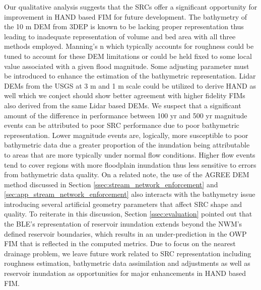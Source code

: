 Our qualitative analysis suggests that the SRCs offer a significant opportunity for improvement in HAND based FIM for future development.
The bathymetry of the 10 m DEM from 3DEP is known to be lacking proper representation thus leading to inadequate representation of volume and bed area with all three methods employed.
Manning's n which typically accounts for roughness could be tuned to account for these DEM limitations or could be held fixed to some local value associated with a given flood magnitude.
Some adjusting parameter must be introduced to enhance the estimation of the bathymetric representation.
Lidar DEMs from the USGS at 3 m and 1 m scale could be utilized to derive HAND as well which we conject should show better agreement with higher fidelity FIMs also derived from the same Lidar based DEMs.
We suspect that a significant amount of the difference in performance between 100 yr and 500 yr magnitude events can be attributed to poor SRC performance due to poor bathymetric representation.
Lower magnitude events are, logically, more susceptible to poor bathymetric data due a greater proportion of the inundation being attributable to areas that are more typically under normal flow conditions.
Higher flow events tend to cover regions with more floodplain inundation thus less sensitive to errors from bathymetric data quality.
On a related note, the use of the AGREE DEM method discussed in Section \ref{ssec:stream_network_enforcement} and \ref{sec:app_stream_network_enforcement} also interacts with the bathymetry issue introducing several artificial geometry parameters that affect SRC shape and quality.
To reiterate in this discussion, Section \ref{ssec:evaluation} pointed out that the BLE's representation of reservoir inundation extends beyond the NWM's defined reservoir boundaries, which results in an under-prediction in the OWP FIM that is reflected in the computed metrics.
Due to focus on the nearest drainage problem, we leave future work related to SRC representation including roughness estimation, bathymetric data assimilation and adjustments as well as reservoir inundation as opportunities for major enhancements in HAND based FIM.

